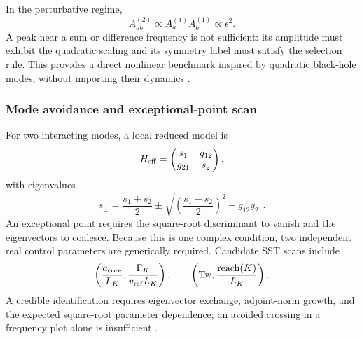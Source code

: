         In the perturbative regime,
        \begin{equation}
            A_{ab}^{(2)}
            \propto
            A_a^{(1)}A_b^{(1)}
            \propto
            \epsilon^2.
            \label{eq:rt_qss_quadratic_amplitude_scaling}
        \end{equation}
        A peak near a sum or difference frequency is not sufficient: its amplitude must
        exhibit the quadratic scaling and its symmetry label must satisfy the selection
        rule.  This provides a direct nonlinear benchmark inspired by quadratic
        black-hole modes, without importing their dynamics
        \cite{BertiEtAl2026BlackHoleSpectroscopy}.

    \subsubsection*{Mode avoidance and exceptional-point scan}

        For two interacting modes, a local reduced model is
        \begin{equation}
            H_{\rm eff}
            =
            \begin{pmatrix}
                s_1 & g_{12}\\
                g_{21} & s_2
            \end{pmatrix},
        \end{equation}
        with eigenvalues
        \begin{equation}
            s_\pm
            =
            \frac{s_1+s_2}{2}
            \pm
            \sqrt{
                \left(
                    \frac{s_1-s_2}{2}
                \right)^2
                +
                g_{12}g_{21}
            }.
            \label{eq:rt_qss_two_mode_eigenvalues}
        \end{equation}
        An exceptional point requires the square-root discriminant to vanish and the
        eigenvectors to coalesce.  Because this is one complex condition, two
        independent real control parameters are generically required.  Candidate SST
        scans include
        \begin{equation}
            \left(
                \frac{a_{\rm core}}{L_K},
                \frac{\Gamma_K}{v_{\rm ref}L_K}
            \right),
            \qquad
            \left(
                \mathrm{Tw},
                \frac{\operatorname{reach}(K)}{L_K}
            \right).
        \end{equation}
        A credible identification requires eigenvector exchange, adjoint-norm growth,
        and the expected square-root parameter dependence; an avoided crossing in a
        frequency plot alone is insufficient
        \cite{BertiEtAl2026BlackHoleSpectroscopy}.

